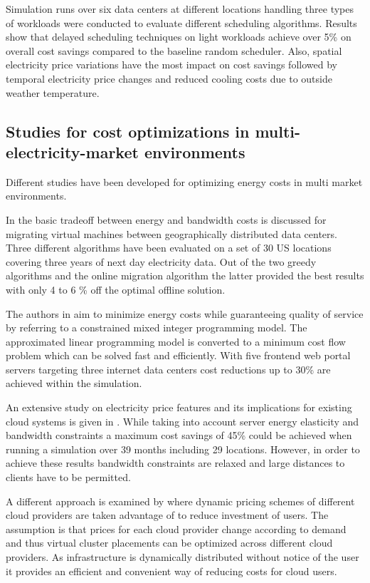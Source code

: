Simulation runs over six data centers at different locations handling three types of workloads were conducted to evaluate different scheduling algorithms.
Results show that delayed scheduling techniques on light workloads achieve over 5\% on overall cost savings compared to the baseline random scheduler. Also, spatial electricity price variations have the most impact on cost savings followed by temporal electricity price changes and reduced cooling costs due to outside weather temperature. 


\subsection{Studies for cost optimizations in multi-electricity-market environments}

Different studies have been developed for optimizing energy costs in multi market environments. 

In \cite{buchbinder2011online} the basic tradeoff between energy and bandwidth costs is discussed for migrating virtual machines between geographically distributed data centers. 
Three different algorithms have been evaluated on a set of 30 US locations covering three years of next day electricity data. Out of the two greedy algorithms and the online migration algorithm the latter provided the best results with only 4 to 6 \% off the optimal offline solution. 

The authors in \cite{rao2010minimizing} aim to minimize energy costs while guaranteeing quality of service by referring to a constrained mixed integer programming model. The approximated linear programming model is converted to a minimum cost flow problem which can be solved fast and efficiently. With five frontend web portal servers targeting three internet data centers cost reductions up to 30\% are achieved within the simulation. 

An extensive study on electricity price features and its implications for existing cloud systems is given in \cite{qureshi2009cutting}. While taking into account server energy elasticity and bandwidth constraints a maximum cost savings of 45\% could be achieved when running a simulation over 39 months including 29 locations. However, in order to achieve these results bandwidth constraints are relaxed and large distances to clients have to be permitted. 

A different approach is examined by \cite{simarro2011dynamic} where dynamic pricing schemes of different cloud providers are taken advantage of to reduce investment of users. The assumption is that prices for each cloud provider change according to demand and thus virtual cluster placements can be optimized across different cloud providers. As infrastructure is dynamically distributed without notice of the user it provides an efficient and convenient way of reducing costs for cloud users. 

